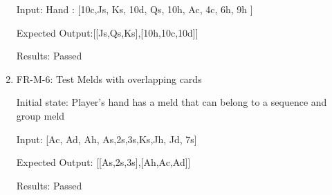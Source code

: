 \documentclass[12pt, titlepage]{article}
\begin{document}
\begin{enumerate}
    Input:  Hand : [10c,Js, Ks, 10d, Qs, 10h, Ac, 4c, 6h, 9h ]
    
    Expected Output:[[Js,Qs,Ks],[10h,10c,10d]]
    
    Results: Passed
    
    \item FR-M-6: Test Melds with overlapping cards
    
    Initial state: Player's hand has a meld that can belong to a sequence and group meld
    
    Input: [Ac, Ad, Ah, As,2s,3s,Ks,Jh, Jd, 7s]
    
    Expected Output: [[As,2s,3s],[Ah,Ac,Ad]]
    
    Results: Passed

\end{enumerate}
\end{document}

